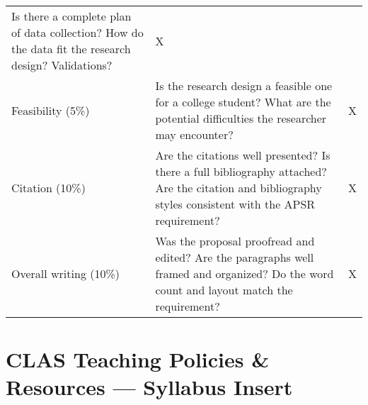 \documentclass[11pt,]{article}
\theoremstyle{definition}
\theoremstyle{definition}
\theoremstyle{definition}
\theoremstyle{remark}
\begin{document}
\begin{longtable}[]{@{}lll@{}}
\begin{minipage}[t]{0.76\columnwidth}
Is there a complete plan of data collection? How do the data fit the
research design? Validations?\strut
\end{minipage} & \begin{minipage}[t]{0.03\columnwidth}\raggedright\strut
X\strut
\end{minipage}\tabularnewline
\begin{minipage}[t]{0.12\columnwidth}\raggedright\strut
Feasibility (5\%)\strut
\end{minipage} & \begin{minipage}[t]{0.76\columnwidth}\raggedright\strut
Is the research design a feasible one for a college student? What are
the potential difficulties the researcher may encounter?\strut
\end{minipage} & \begin{minipage}[t]{0.03\columnwidth}\raggedright\strut
X\strut
\end{minipage}\tabularnewline
\begin{minipage}[t]{0.12\columnwidth}\raggedright\strut
Citation (10\%)\strut
\end{minipage} & \begin{minipage}[t]{0.76\columnwidth}\raggedright\strut
Are the citations well presented? Is there a full bibliography attached?
Are the citation and bibliography styles consistent with the APSR
requirement?\strut
\end{minipage} & \begin{minipage}[t]{0.03\columnwidth}\raggedright\strut
X\strut
\end{minipage}\tabularnewline
\begin{minipage}[t]{0.12\columnwidth}\raggedright\strut
Overall writing (10\%)\strut
\end{minipage} & \begin{minipage}[t]{0.76\columnwidth}\raggedright\strut
Was the proposal proofread and edited? Are the paragraphs well framed
and organized? Do the word count and layout match the requirement?\strut
\end{minipage} & \begin{minipage}[t]{0.03\columnwidth}\raggedright\strut
X\strut
\end{minipage}\tabularnewline
\bottomrule
\end{longtable}

\clearpage

\section{CLAS Teaching Policies \& Resources --- Syllabus
Insert}\label{clas-teaching-policies-resources-syllabus-insert}
\end{document}
